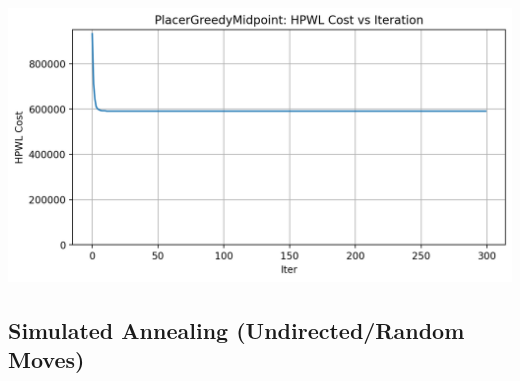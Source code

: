 {
    \centering
    \includegraphics[width=0.7\columnwidth]{figures/results/PlacerGreedyMidpoint/PlacerGreedyMidpoint_cost_history.png}
    \label{fig:PGMCurve}
}

\subsection{Simulated Annealing (Undirected/Random Moves)}
